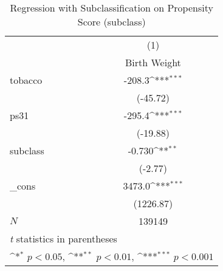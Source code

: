 \begin{table}[htbp]\centering
\def\sym#1{\ifmmode^{#1}\else\(^{#1}\)\fi}
\caption{Regression with Subclassification on Propensity Score (subclass)\label{e2}}
\begin{tabular}{l*{1}{c}}
\hline\hline
            &\multicolumn{1}{c}{(1)}\\
            &\multicolumn{1}{c}{Birth Weight}\\
\hline
tobacco     &      -208.3\sym{***}\\
            &    (-45.72)         \\
[1em]
ps31        &      -295.4\sym{***}\\
            &    (-19.88)         \\
[1em]
subclass    &      -0.730\sym{**} \\
            &     (-2.77)         \\
[1em]
\_cons      &      3473.0\sym{***}\\
            &   (1226.87)         \\
\hline
\(N\)       &      139149         \\
\hline\hline
\multicolumn{2}{l}{\footnotesize \textit{t} statistics in parentheses}\\
\multicolumn{2}{l}{\footnotesize \sym{*} \(p<0.05\), \sym{**} \(p<0.01\), \sym{***} \(p<0.001\)}\\
\end{tabular}
\end{table}
